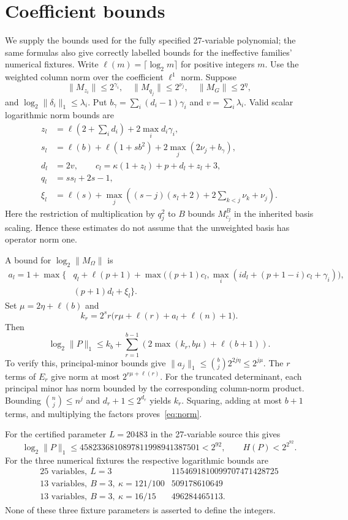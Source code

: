 \documentclass[11pt,a4paper]{article}
\begin{document}
\section{Coefficient bounds}
We supply the bounds used for the fully specified 27-variable polynomial;
the same formulas also give correctly labelled bounds for the ineffective
families' numerical fixtures. Write $\ell(m)=\lceil\log_2m\rceil$ for
positive integers $m$. Use the weighted column norm over the coefficient
$\ell^1$ norm. Suppose
\[
 \|M_{z_i}\|\le2^{\gamma_i},\quad
 \|M_{q_j}\|\le2^{\nu_j},\quad
 \|M_G\|\le2^\eta,
\]
and $\log_2\|\delta_i\|_1\le\lambda_i$.
Put $b_\gamma=\sum_i(d_i-1)\gamma_i$ and $v=\sum_i\lambda_i$.
Valid scalar logarithmic norm bounds are
\begin{align*}
 z_l&=\ell(2+\sum_i d_i)+2\max_i d_i\gamma_i,\\
 s_l&=\ell(b)+\ell(1+sb^2)+2\max_j(2\nu_j+b_\gamma),\\
 d_l&=2v,\qquad
 c_l=\kappa(1+z_l)+p+d_l+z_l+3,\\
 q_l&=ss_l+2s-1,\\
 \xi_l&=\ell(s)+\max_j\left((s-j)(s_l+2)
                         +2\sum_{k<j}\nu_k+\nu_j\right).
\end{align*}
Here the restriction of multiplication by $q_j^2$ to $B$ bounds
$M_{c_j}^B$ in the inherited basis scaling. Hence these estimates do not
assume that the unweighted basis has operator norm one.

A bound for $\log_2\|M_\Omega\|$ is
\begin{align*}
 a_l=1+\max\bigg\{&q_l+\ell(p+1)+
       \max\big((p+1)c_l,\max_i(id_l+(p+1-i)c_l+\gamma_i)\big),\\
       &(p+1)d_l+\xi_l\bigg\}.
\end{align*}
Set $\mu=2\eta+\ell(b)$ and
\[
 k_r=2^sr\big(r\mu+\ell(r)+a_l+\ell(n)+1\big).
\]
Then
\begin{equation}\label{eq:norm}
 \log_2\|P\|_1\le k_b+
 \sum_{r=1}^{b-1}\left(2\max(k_r,b\mu)+\ell(b+1)\right).
\end{equation}
To verify this, principal-minor bounds give
$\|a_j\|_1\le\binom bj2^{2j\eta}\le2^{j\mu}$.
The $r$ terms of $E_r$ give norm at most $2^{r\mu+\ell(r)}$.
For the truncated determinant, each principal minor has norm bounded by
the corresponding column-norm product. Bounding $\binom nj\le n^j$
and $d_r+1\le2^{d_r}$ yields $k_r$. Squaring, adding at most $b+1$
terms, and multiplying the factors proves~\eqref{eq:norm}.

For the certified parameter $L=20483$ in the 27-variable source this gives
\[
 \log_2\|P\|_1\le4582336810897811998941387501<2^{92},
 \qquad H(P)<2^{2^{92}}.
\]
For the three numerical fixtures the respective logarithmic bounds are
\[
 \begin{array}{c|r}
 25\text{ variables},\ L=3&1154691810099707471428725\\
 13\text{ variables},\ B=3,\ \kappa=121/100&509178610649\\
 13\text{ variables},\ B=3,\ \kappa=16/15&496284465113.
 \end{array}
\]
None of these three fixture parameters is asserted to define the integers.
\end{document}
